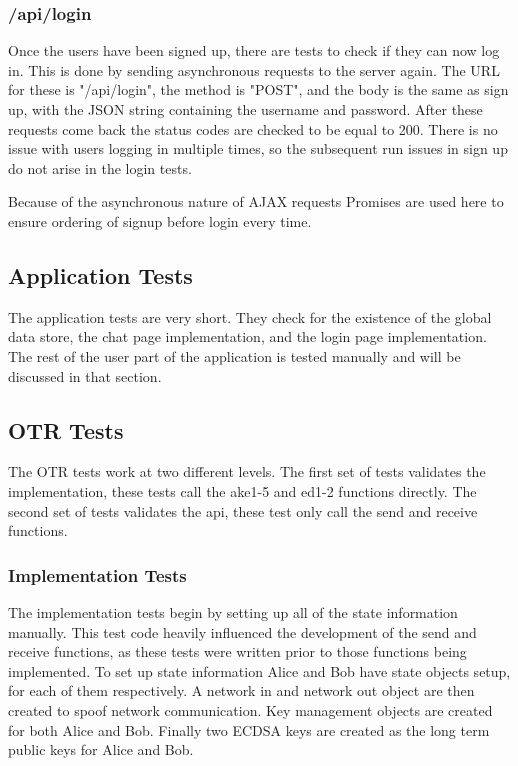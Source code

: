 \subsubsection{/api/login}


Once the users have been signed up, there are tests to check if they can now log in. This is done by sending asynchronous requests to the server again. The URL for these is "/api/login", the method is "POST", and the body is the same as sign up, with the JSON string containing the username and password. After these requests come back the status codes are checked to be equal to 200. There is no issue with users logging in multiple times, so the subsequent run issues in sign up do not arise in the login tests.


Because of the asynchronous nature of AJAX requests Promises are used here to ensure ordering of signup before login every time.


\subsection{Application Tests}


The application tests are very short. They check for the existence of the global data store, the chat page implementation, and the login page implementation. The rest of the user part of the application is tested manually and will be discussed in that section.


\subsection{OTR Tests}


The OTR tests work at two different levels. The first set of tests validates the implementation, these tests call the ake1-5 and ed1-2 functions directly. The second set of tests validates the api, these test only call the send and receive functions.


\subsubsection{Implementation Tests}


The implementation tests begin by setting up all of the state information manually. This test code heavily influenced the development of the send and receive functions, as these tests were written prior to those functions being implemented. To set up state information Alice and Bob have state objects setup, for each of them respectively. A network in and network out object are then created to spoof network communication. Key management objects are created for both Alice and Bob. Finally two ECDSA keys are created as the long term public keys for Alice and Bob.



